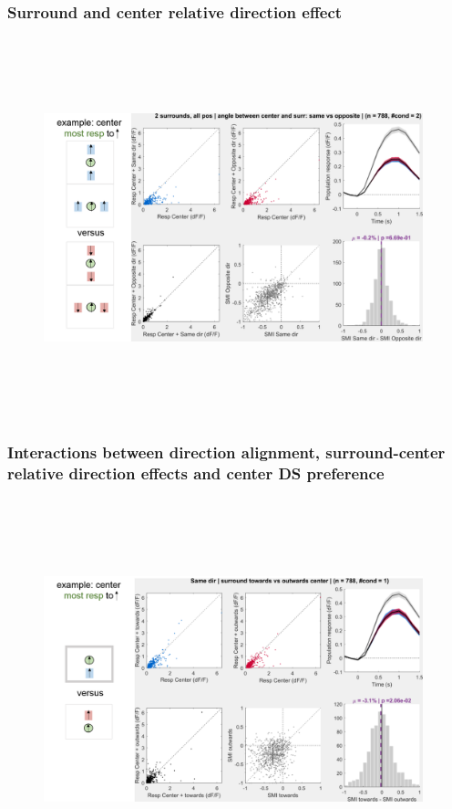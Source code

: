 \subsubsection{Surround and center relative direction effect}

\begin{figure}[H] \centering \includegraphics[width=11cm,height=11cm,keepaspectratio]{Figures/7.Results/population/sel/diagrams/18.png} 
\end{figure}

\subsubsection{Interactions between direction alignment, surround-center relative direction effects and center DS preference}

\begin{figure}[H] \centering \includegraphics[width=11cm,height=11cm,keepaspectratio]{Figures/7.Results/population/sel/diagrams/19.png} 
\end{figure}

